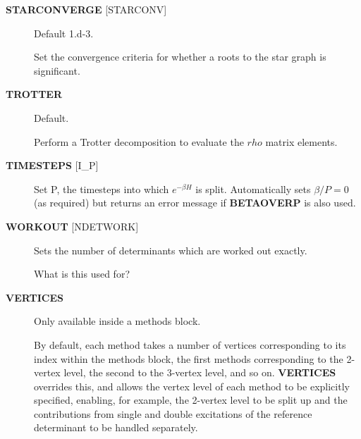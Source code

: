 \documentclass[openany,a4paper,10pt]{manual}
\begin{document}
\begin{description}
\item[\textbf{STARCONVERGE} {[}STARCONV{]}]
Default 1.d-3.

Set the convergence criteria for whether a roots to the star graph
is significant.

\item[\textbf{TROTTER}]
Default.

Perform a Trotter decomposition to evaluate the $rho$ matrix elements.

\item[\textbf{TIMESTEPS} {[}I\_P{]}]
Set P, the timesteps into which $e^{-\beta H}$ is split.  Automatically
sets $\beta/P=0$ (as required) but returns an error message if \textbf{BETAOVERP}
is also used.

\item[\textbf{WORKOUT} {[}NDETWORK{]}]
Sets the number of determinants which are worked out exactly.

\begin{notice}[note]
What is this used for?
\end{notice}

\item[\textbf{VERTICES}]
Only available inside a methods block.

By default, each method takes a
number of vertices corresponding to its index within the methods
block, the first methods corresponding to the 2-vertex level, the
second to the 3-vertex level, and so on.  \textbf{VERTICES} overrides this,
and allows the vertex level of each method to be explicitly specified,
enabling, for example, the 2-vertex level to be split up and the
contributions from single and double excitations of the reference
determinant to be handled separately.

\end{description}
\end{document}
